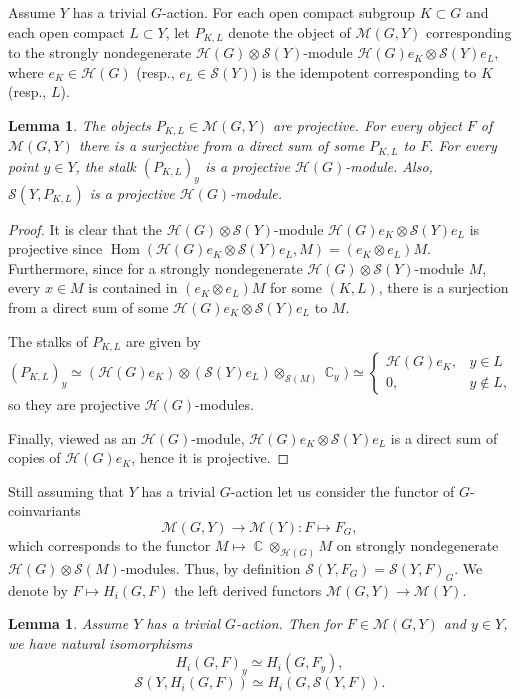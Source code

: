 \documentclass[12pt,reqno]{amsart}
\DeclareMathOperator\C{\mathbb C}
\newtheorem{lemma}[theorem]{Lemma}
\theoremstyle{definition}
\theoremstyle{remark}
\numberwithin{equation}{section}
\newcommand{\ot}{\otimes}
\newcommand{\Hom}{\operatorname{Hom}}
\renewcommand{\SS}{{\mathcal S}}
\newcommand{\HH}{{\mathcal H}}
\newcommand{\MM}{{\mathcal M}}
\newcommand{\sub}{\subset}
\begin{document}
Assume $Y$ has a trivial $G$-action. For each open compact subgroup $K\sub G$ and each open compact $L\sub Y$,
let $P_{K,L}$ denote the object of $\MM(G,Y)$ corresponding to the strongly nondegenerate $\HH(G)\ot\SS(Y)$-module $\HH(G)e_K\ot \SS(Y)e_L$,
where $e_K\in \HH(G)$ (resp., $e_L\in \SS(Y)$) is the idempotent corresponding to $K$ (resp., $L$).

\begin{lemma}\label{P-KL-lem}
The objects $P_{K,L}\in \MM(G,Y)$ are projective. For every object $F$ of $\MM(G,Y)$ there is a surjective from a direct sum of some $P_{K,L}$ to $F$.
For every point $y\in Y$, the stalk $(P_{K,L})_y$ is a projective $\HH(G)$-module. Also, $\SS(Y,P_{K,L})$ is a projective $\HH(G)$-module.
\end{lemma}

\begin{proof}
It is clear that the $\HH(G)\ot\SS(Y)$-module $\HH(G)e_K\ot \SS(Y)e_L$ is projective since $\Hom(\HH(G)e_K\ot \SS(Y)e_L,M)=(e_K\ot e_L)M$.
Furthermore, since for a strongly nondegenerate $\HH(G)\ot \SS(Y)$-module $M$, every $x\in M$ is contained in $(e_K\ot e_L)M$ for
some $(K,L)$, there is a surjection from a direct sum of some $\HH(G)e_K\ot \SS(Y)e_L$ to $M$.

The stalks of $P_{K,L}$ are given by
$$(P_{K,L})_y\simeq (\HH(G)e_K)\ot(\SS(Y)e_L)\ot_{\SS(M)}\C_y)\simeq \begin{cases} \HH(G)e_K, & y\in L\\ 0, &y\not\in L,\end{cases}$$
so they are projective $\HH(G)$-modules. 

Finally, viewed as an $\HH(G)$-module, $\HH(G)e_K\ot \SS(Y)e_L$ is a direct sum of copies of $\HH(G)e_K$, hence it is projective.
\end{proof}

Still assuming that $Y$ has a trivial $G$-action let us consider the functor of $G$-coinvariants
$$\MM(G,Y)\to \MM(Y): F\mapsto F_G,$$
which corresponds to the functor $M\mapsto \C\ot_{\HH(G)}M$ on strongly nondegenerate $\HH(G)\ot\SS(M)$-modules.
Thus, by definition $\SS(Y,F_G)=\SS(Y,F)_G$.
We denote by $F\mapsto H_i(G,F)$ the left derived functors $\MM(G,Y)\to \MM(Y)$.

\begin{lemma}\label{trivial-G-action-lem} 
Assume $Y$ has a trivial $G$-action. Then for $F\in \MM(G,Y)$ and $y\in Y$, we have
natural isomorphisms
$$H_i(G,F)_y\simeq H_i(G,F_y),$$
$$\SS(Y,H_i(G,F))\simeq H_i(G,\SS(Y,F)).$$
\end{lemma}
\end{document}
